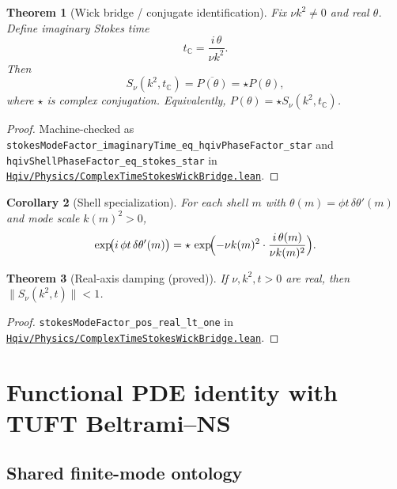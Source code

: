 \documentclass[11pt]{amsart}
\newcommand{\leanrepo}{https://github.com/HQIV/hqiv-lean/blob/main}
\newcommand{\leanfile}[1]{\href{\leanrepo/#1}{\nolinkurl{#1}}}
\newcommand{\leanid}[1]{\nolinkurl{#1}}
\newtheorem{theorem}{Theorem}[section]
\newtheorem{corollary}[theorem]{Corollary}
\begin{document}
\begin{theorem}[Wick bridge / conjugate identification]
\label{thm:wick}
Fix $\nu k^2\neq 0$ and real $\theta$.
Define imaginary Stokes time
\begin{equation}
  t_{\mathbb C}=\frac{i\,\theta}{\nu k^2}.
  \label{eq:imag-stokes-time}
\end{equation}
Then
\begin{equation}
  S_\nu(k^2,t_{\mathbb C})=\overline{P(\theta)}=\star P(\theta),
  \label{eq:wick-main}
\end{equation}
where $\star$ is complex conjugation.
Equivalently, $P(\theta)=\star S_\nu(k^2,t_{\mathbb C})$.
\end{theorem}

\begin{proof}
Machine-checked as \leanid{stokesModeFactor_imaginaryTime_eq_hqivPhaseFactor_star} and
\leanid{hqivShellPhaseFactor_eq_stokes_star} in
\leanfile{Hqiv/Physics/ComplexTimeStokesWickBridge.lean}.
\end{proof}

\begin{corollary}[Shell specialization]
\label{cor:shell}
For each shell $m$ with $\theta(m)=\phi t\,\delta\theta'(m)$ and mode scale $k(m)^2>0$,
\begin{equation}
  \exp\!\bigl(i\,\phi t\,\delta\theta'(m)\bigr)
  =\star\,\exp\!\Bigl(-\nu k(m)^2\cdot\frac{i\,\theta(m)}{\nu k(m)^2}\Bigr).
\end{equation}
\end{corollary}

\begin{theorem}[Real-axis damping (proved)]
\label{thm:damp}
If $\nu,k^2,t>0$ are real, then $\|S_\nu(k^2,t)\|<1$.
\end{theorem}

\begin{proof}
\leanid{stokesModeFactor_pos_real_lt_one} in
\leanfile{Hqiv/Physics/ComplexTimeStokesWickBridge.lean}.
\end{proof}

\section{Functional PDE identity with TUFT Beltrami--NS}
\label{sec:pde-functional}

\subsection{Shared finite-mode ontology}
\end{document}
